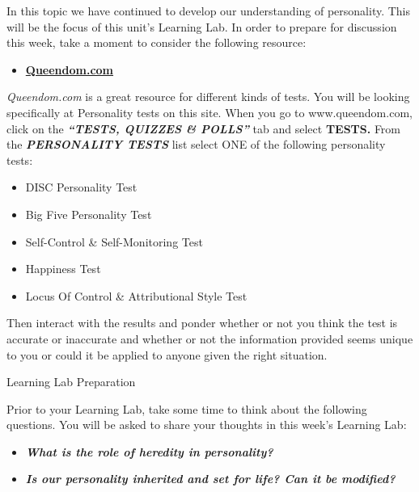 \documentclass[
]{book}
\providecommand{\tightlist}{%
  \setlength{\itemsep}{0pt}\setlength{\parskip}{0pt}}
\begin{document}
\begin{reflect}
In this topic we have continued to develop our understanding of personality. This will be the focus of this unit's Learning Lab. In order to prepare for discussion this week, take a moment to consider the following resource:

\begin{itemize}
\tightlist
\item
  \href{https://www.queendom.com/}{\textbf{Queendom.com}}
\end{itemize}

\emph{Queendom.com} is a great resource for different kinds of tests. You will be looking specifically at Personality tests on this site. When you go to www.queendom.com, click on the \textbf{\emph{``TESTS, QUIZZES \& POLLS''}} tab and select \textbf{TESTS.} From the \textbf{\emph{PERSONALITY TESTS}} list select ONE of the following personality tests:

\begin{itemize}
\tightlist
\item
  DISC Personality Test\\
\item
  Big Five Personality Test\\
\item
  Self-Control \& Self-Monitoring Test\\
\item
  Happiness Test\\
\item
  Locus Of Control \& Attributional Style Test
\end{itemize}

Then interact with the results and ponder whether or not you think the test is accurate or inaccurate and whether or not the information provided seems unique to you or could it be applied to anyone given the right situation.

{Learning Lab Preparation}

Prior to your Learning Lab, take some time to think about the following questions.
You will be asked to share your thoughts in this week's Learning Lab:

\begin{itemize}
\tightlist
\item
  \textbf{\emph{What is the role of heredity in personality?}}\\
\item
  \textbf{\emph{Is our personality inherited and set for life? Can it be modified?}}
\end{itemize}


\end{reflect}
\end{document}
